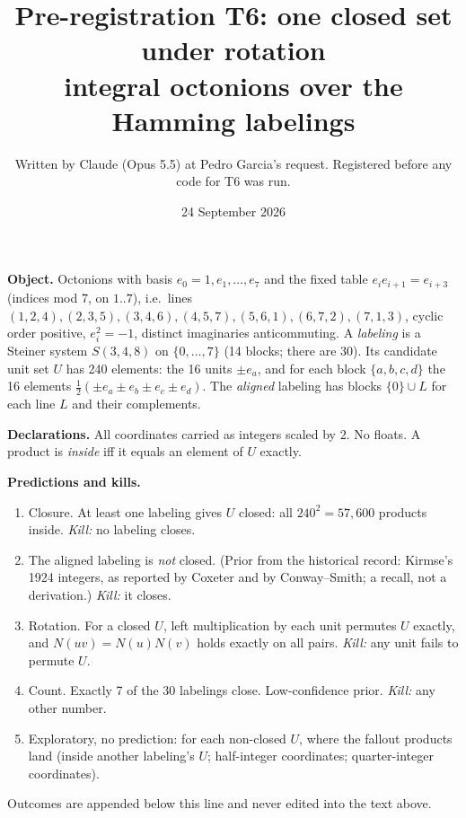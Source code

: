 \documentclass[11pt,a4paper]{article}
\title{Pre-registration T6: one closed set under rotation\\ \large integral octonions over the Hamming labelings}
\author{Written by Claude (Opus 5.5) at Pedro Garcia's request. Registered before any code for T6 was run.}
\date{24 September 2026}
\begin{document}
\maketitle
\textbf{Object.} Octonions with basis $e_0=1,e_1,\dots,e_7$ and the fixed table $e_ie_{i+1}=e_{i+3}$ (indices mod 7, on $1..7$), i.e.\ lines $(1,2,4),(2,3,5),(3,4,6),(4,5,7),(5,6,1),(6,7,2),(7,1,3)$, cyclic order positive, $e_i^2=-1$, distinct imaginaries anticommuting.
A \emph{labeling} is a Steiner system $S(3,4,8)$ on $\{0,\dots,7\}$ (14 blocks; there are 30). Its candidate unit set $U$ has 240 elements: the 16 units $\pm e_a$, and for each block $\{a,b,c,d\}$ the 16 elements $\tfrac12(\pm e_a\pm e_b\pm e_c\pm e_d)$. The \emph{aligned} labeling has blocks $\{0\}\cup L$ for each line $L$ and their complements.

\textbf{Declarations.} All coordinates carried as integers scaled by 2. No floats. A product is \emph{inside} iff it equals an element of $U$ exactly.

\textbf{Predictions and kills.}
\begin{enumerate}
\item[H1] Closure. At least one labeling gives $U$ closed: all $240^2=57{,}600$ products inside. \emph{Kill:} no labeling closes.
\item[H2] The aligned labeling is \emph{not} closed. (Prior from the historical record: Kirmse's 1924 integers, as reported by Coxeter and by Conway--Smith; a recall, not a derivation.) \emph{Kill:} it closes.
\item[H3] Rotation. For a closed $U$, left multiplication by each unit permutes $U$ exactly, and $N(uv)=N(u)N(v)$ holds exactly on all pairs. \emph{Kill:} any unit fails to permute $U$.
\item[H4] Count. Exactly 7 of the 30 labelings close. Low-confidence prior. \emph{Kill:} any other number.
\item[E1] Exploratory, no prediction: for each non-closed $U$, where the fallout products land (inside another labeling's $U$; half-integer coordinates; quarter-integer coordinates).
\end{enumerate}
Outcomes are appended below this line and never edited into the text above.
\end{document}
